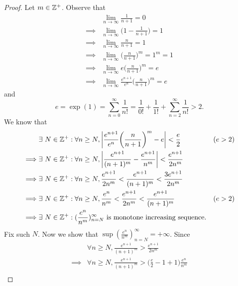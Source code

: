 \begin{proof}
  Let \(m \in \mathbb{Z}^+\).
  Observe that
  \begin{align*}
             & \lim_{n \to \infty} \frac{1}{n + 1} = 0                                     \\
    \implies & \lim_{n \to \infty} \bigg(1 - \frac{1}{n + 1}\bigg) = 1                     \\
    \implies & \lim_{n \to \infty} \frac{n}{n + 1} = 1                                     \\
    \implies & \lim_{n \to \infty} \bigg(\frac{n}{n + 1}\bigg)^m = 1^m = 1                 \\
    \implies & \lim_{n \to \infty} e \bigg(\frac{n}{n + 1}\bigg)^m = e                     \\
    \implies & \lim_{n \to \infty} \frac{e^{n + 1}}{e^n} \bigg(\frac{n}{n + 1}\bigg)^m = e
  \end{align*}
  and
  \[
    e = \exp(1) = \sum_{n = 0}^\infty \frac{1}{n!} = \frac{1}{0!} + \frac{1}{1!} + \sum_{n = 2}^\infty \frac{1}{n!} > 2.
  \]
  We know that
  \begin{align*}
             & \exists\ N \in \mathbb{Z}^+ : \forall n \geq N, \left\lvert\frac{e^{n + 1}}{e^n} \bigg(\frac{n}{n + 1}\bigg)^m - e\right\rvert < \frac{e}{2}         & (e > 2) \\
    \implies & \exists\ N \in \mathbb{Z}^+ : \forall n \geq N, \left\lvert\frac{e^{n + 1}}{(n + 1)^m} - \frac{e^{n + 1}}{n^m}\right\rvert < \frac{e^{n + 1}}{2 n^m}           \\
    \implies & \exists\ N \in \mathbb{Z}^+ : \forall n \geq N, \frac{e^{n + 1}}{2 n^m} < \frac{e^{n + 1}}{(n + 1)^m} < \frac{3 e^{n + 1}}{2 n^m}             \\
    \implies & \exists\ N \in \mathbb{Z}^+ : \forall n \geq N, \frac{e^n}{n^m} < \frac{e^{n + 1}}{2 n^m} < \frac{e^{n + 1}}{(n + 1)^m}             & (e > 2) \\
    \implies & \exists\ N \in \mathbb{Z}^+ : (\frac{e^n}{n^m})_{n = N}^\infty \text{ is monotone increasing sequence}.
  \end{align*}
  Fix such \(N\).
  Now we show that \(\sup(\frac{e^n}{n^m})_{n = N}^\infty = +\infty\).
  Since
  \begin{align*}
             & \forall n \geq N, \frac{e^{n + 1}}{(n + 1)^m} > \frac{e^{n + 1}}{2 n^m}                                                                           \\
    \implies & \forall n \geq N, \frac{e^{n + 1}}{(n + 1)^m} > \bigg(\frac{e}{2} - 1 + 1\bigg) \frac{e^n}{n^m}                                                   \\

\end{align*}
\end{proof}
